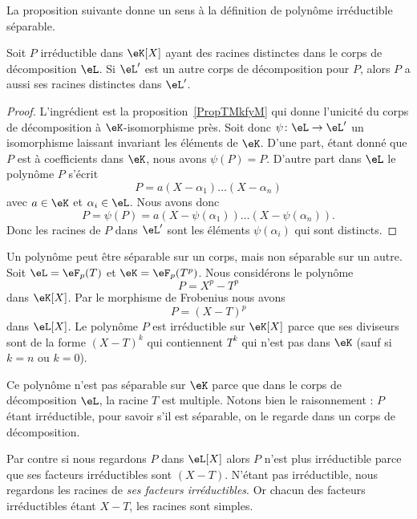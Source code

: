 La proposition suivante donne un sens à la définition de polynôme irréductible séparable.
\begin{proposition}
    Soit \( P\) irréductible dans \( \eK[X]\) ayant des racines distinctes dans le corps de décomposition \( \eL\). Si \( \eL'\) est un autre corps de décomposition pour \( P\), alors \( P\) a aussi ses racines distinctes dans \( \eL'\).
\end{proposition}

\begin{proof}
    L'ingrédient est la proposition~\ref{PropTMkfyM} qui donne l'unicité du corps de décomposition à \( \eK\)-isomorphisme près. Soit donc \( \psi\colon \eL\to \eL'\) un isomorphisme laissant invariant les éléments de \( \eK\). D'une part, étant donné que \( P\) est à coefficients dans \( \eK\), nous avons \( \psi(P)=P\). D'autre part dans \( \eL\) le polynôme \( P\) s'écrit
    \begin{equation}
        P=a(X-\alpha_1)\ldots (X-\alpha_n)
    \end{equation}
    avec \( a\in \eK\) et \( \alpha_i\in \eL\). Nous avons donc
    \begin{equation}
        P=\psi(P)=a(X-\psi(\alpha_1))\ldots (X-\psi(\alpha_n)).
    \end{equation}
    Donc les racines de \( P\) dans \( \eL'\) sont les éléments \( \psi(\alpha_i)\) qui sont distincts.
\end{proof}

\begin{example}
    Un polynôme peut être séparable sur un corps, mais non séparable sur un autre. Soit \( \eL=\eF_p(T)\) et \( \eK=\eF_p(T^p)\). Nous considérons le polynôme
    \begin{equation}
        P=X^p-T^p
    \end{equation}
    dans \( \eK[X]\). Par le morphisme de Frobenius nous avons
    \begin{equation}
        P=(X-T)^p
    \end{equation}
    dans \( \eL[X]\). Le polynôme \( P\) est irréductible sur \( \eK[X]\) parce que ses diviseurs sont de la forme \( (X-T)^k\) qui contiennent \( T^k\) qui n'est pas dans \( \eK\) (sauf si \( k=n\) ou \( k=0\)).

    Ce polynôme n'est pas séparable sur \( \eK\) parce que dans le corps de décomposition \( \eL\), la racine \( T\) est multiple. Notons bien le raisonnement : \( P\) étant irréductible, pour savoir s'il est séparable, on le regarde dans un corps de décomposition.

    Par contre si nous regardons \( P\) dans \( \eL[X]\) alors \( P\) n'est plus irréductible parce que ses facteurs irréductibles sont \( (X-T)\). N'étant pas irréductible, nous regardons les racines de \emph{ses facteurs irréductibles}. Or chacun des facteurs irréductibles étant \( X-T\), les racines sont simples.
\end{example}


